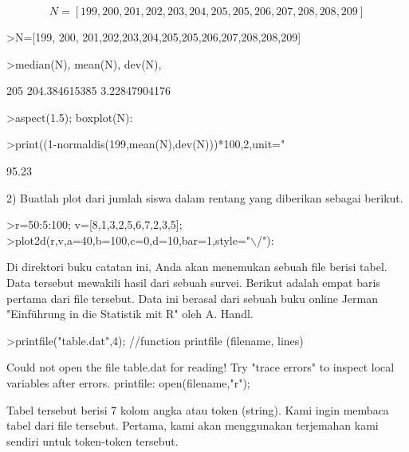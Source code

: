 \documentclass[a4paper,10pt]{article}
\begin{document}
\begin{eulernotebook}
\begin{eulercomment}
\end{eulercomment}
\begin{eulerformula}
\[
N=[199,200,201,202,203,204,205,205,206,207,208,208,209]
\]
\end{eulerformula}
\begin{eulercomment}
\end{eulercomment}
\begin{eulerprompt}
>N=[199, 200, 201,202,203,204,205,205,206,207,208,208,209]
\end{eulerprompt}
\begin{euleroutput}
  [199,  200,  201,  202,  203,  204,  205,  205,  206,  207,  208,  208,
  209]
\end{euleroutput}
\begin{eulerprompt}
>median(N), mean(N), dev(N),
\end{eulerprompt}
\begin{euleroutput}
  205
  204.384615385
  3.22847904176
\end{euleroutput}
\begin{eulerprompt}
>aspect(1.5); boxplot(N):
\end{eulerprompt}
\begin{eulerprompt}
>print((1-normaldis(199,mean(N),dev(N)))*100,2,unit=" %
\end{eulerprompt}
\begin{euleroutput}
       95.23 %
\end{euleroutput}
\begin{eulercomment}
2) Buatlah plot dari jumlah siswa dalam rentang yang diberikan sebagai
berikut.
\end{eulercomment}
\begin{eulerprompt}
>r=50:5:100; v=[8,1,3,2,5,6,7,2,3,5];
>plot2d(r,v,a=40,b=100,c=0,d=10,bar=1,style="\(\backslash\)/"):
\end{eulerprompt}
\begin{eulercomment}
Di direktori buku catatan ini, Anda akan menemukan sebuah file berisi
tabel. Data tersebut mewakili hasil dari sebuah survei. Berikut adalah
empat baris pertama dari file tersebut. Data ini berasal dari sebuah
buku online Jerman "Einführung in die Statistik mit R" oleh A. Handl.
\end{eulercomment}
\begin{eulerprompt}
>printfile("table.dat",4); //function printfile (filename, lines)
\end{eulerprompt}
\begin{euleroutput}
  Could not open the file
  table.dat
  for reading!
  Try "trace errors" to inspect local variables after errors.
  printfile:
      open(filename,"r");
\end{euleroutput}
\begin{eulercomment}
Tabel tersebut berisi 7 kolom angka atau token (string). Kami ingin
membaca tabel dari file tersebut. Pertama, kami akan menggunakan
terjemahan kami sendiri untuk token-token tersebut.


\end{eulercomment}
\end{eulernotebook}
\end{document}
